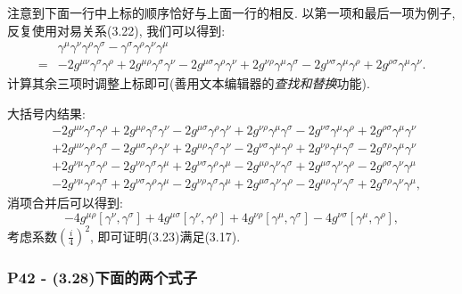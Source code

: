 \documentclass[cn,hazy,blue,11pt,device=normal,chinesefont=founder]{elegantnote}
\begin{document}
注意到下面一行中上标的顺序恰好与上面一行的相反. 以第一项和最后一项为例子, 反复使用对易关系(3.22), 我们可以得到: 
\begin{equation}
  \begin{aligned}
    &\gamma^\mu \gamma^\nu \gamma^\rho \gamma^\sigma - \gamma^\sigma \gamma^\rho \gamma^\nu \gamma^\mu \\
    = &- 2g^{\mu\nu}\gamma^\sigma \gamma^\rho + 2g^{\mu\rho}\gamma^\sigma \gamma^\nu - 2g^{\mu\sigma}\gamma^\rho \gamma^\nu + 2g^{\nu\rho}\gamma^\mu \gamma^\sigma - 2g^{\nu\sigma}\gamma^\mu \gamma^\rho + 2g^{\rho\sigma}\gamma^\mu \gamma^\nu. 
  \end{aligned}
\end{equation}
计算其余三项时调整上标即可(善用文本编辑器的\textit{查找和替换}功能). 

大括号内结果: 
\begin{equation}
  \begin{aligned}
    &- 2g^{\mu\nu}\gamma^\sigma \gamma^\rho + 2g^{\mu\rho}\gamma^\sigma \gamma^\nu - 2g^{\mu\sigma}\gamma^\rho \gamma^\nu + 2g^{\nu\rho}\gamma^\mu \gamma^\sigma - 2g^{\nu\sigma}\gamma^\mu \gamma^\rho + 2g^{\rho\sigma}\gamma^\mu \gamma^\nu \\
    &+ 2g^{\mu\nu}\gamma^\rho \gamma^\sigma - 2g^{\mu\sigma}\gamma^\rho \gamma^\nu + 2g^{\mu\rho}\gamma^\sigma \gamma^\nu - 2g^{\nu\sigma}\gamma^\mu \gamma^\rho + 2g^{\nu\rho}\gamma^\mu \gamma^\sigma - 2g^{\sigma\rho}\gamma^\mu \gamma^\nu \\
    &+ 2g^{\nu\mu}\gamma^\sigma \gamma^\rho - 2g^{\nu\rho}\gamma^\sigma \gamma^\mu + 2g^{\nu\sigma}\gamma^\rho \gamma^\mu - 2g^{\mu\rho}\gamma^\nu \gamma^\sigma + 2g^{\mu\sigma}\gamma^\nu \gamma^\rho - 2g^{\rho\sigma}\gamma^\nu \gamma^\mu \\
    &- 2g^{\nu\mu}\gamma^\rho \gamma^\sigma + 2g^{\nu\sigma}\gamma^\rho \gamma^\mu - 2g^{\nu\rho}\gamma^\sigma \gamma^\mu + 2g^{\mu\sigma}\gamma^\nu \gamma^\rho - 2g^{\mu\rho}\gamma^\nu \gamma^\sigma + 2g^{\sigma\rho}\gamma^\nu \gamma^\mu,  
  \end{aligned}
\end{equation}
消项合并后可以得到: 
\begin{equation}
  -4g^{\mu\rho}[\gamma^\nu, \gamma^\sigma] + 4g^{\mu\sigma}[\gamma^\nu, \gamma^\rho] + 4g^{\nu\rho}[\gamma^\mu, \gamma^\sigma] - 4g^{\nu\sigma}[\gamma^\mu, \gamma^\rho],  
\end{equation}
考虑系数$(\frac{i}{4})^2$, 即可证明(3.23)满足(3.17).

\subsubsection{P42 - (3.28)下面的两个式子}
\end{document}
